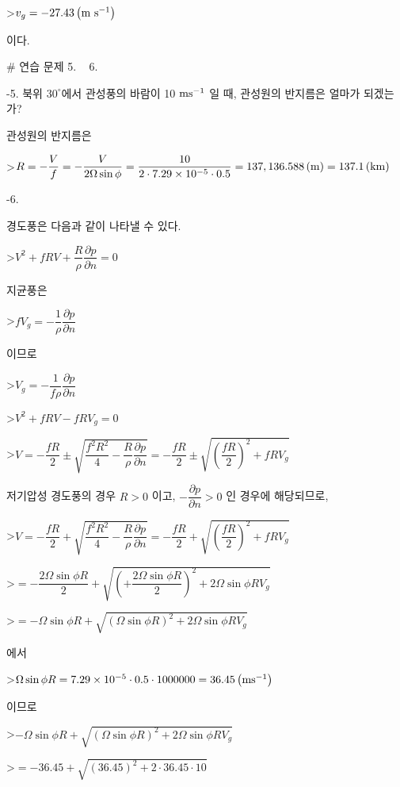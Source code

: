 >$v_{g} = - 27.43 \left( \rm m~ s^{-1} \right) $

이다.



# 연습 문제 5. ~ 6.


-5. 북위  $30^{\circ}$에서 관성풍의 바람이 10 $\rm m s^{-1}$ 일 때, 관성원의 반지름은 얼마가 되겠는가?


관성원의 반지름은 

>$ R = - \dfrac{V}{f} = - \dfrac{V}{2 \Omega \sin \phi} = \dfrac{10}{2 \cdot 7.29 \times 10^{-5} \cdot 0.5} = 137,136.588 \left( \rm m \right) = 137.1 \left( \rm km \right)$

-6. 


경도풍은 다음과 같이 나타낼 수 있다.

>$ V^{2} + fRV + \dfrac{R}{\rho} \dfrac{\partial p}{\partial n} = 0$

지균풍은 

>$f V_{g} = -\dfrac{1}{\rho}\dfrac{\partial p}{\partial n}$ 

이므로 

>$V_{g} = -\dfrac{1}{f \rho}\dfrac{\partial p}{\partial n}$ 

>$ V^{2} + fRV - f R V_{g} = 0$


>$ V = -\dfrac{fR}{2} \pm \sqrt{ \dfrac{f^{2} R^{2}}{4} - \dfrac{R}{\rho}\dfrac{\partial p}{\partial n} } = -\dfrac{fR}{2} \pm \sqrt{ {\left(\dfrac{f R}{2} \right)}^{2} + f R V_{g} }$


저기압성 경도풍의 경우 $ R > 0$ 이고, $- \dfrac{\partial p}{\partial n} > 0$ 인 경우에 해당되므로, 

>$ V = -\dfrac{fR}{2} + \sqrt{ \dfrac{f^{2} R^{2}}{4} - \dfrac{R}{\rho}\dfrac{\partial p}{\partial n} } = -\dfrac{fR}{2} + \sqrt{ {\left(\dfrac{f R}{2} \right)}^{2} + f R V_{g} }$

>$ =  -\dfrac{ 2 \Omega \sin \phi R}{2} + \sqrt{ {\left(+\dfrac{ 2 \Omega \sin \phi R}{2} \right)}^{2} + 2 \Omega \sin \phi R V_{g} } $

>$ =  -\Omega \sin \phi R + \sqrt{ {\left(\Omega \sin \phi R \right)}^{2} + 2 \Omega \sin \phi R V_{g} } $

에서 

>$ \Omega \sin \phi R = 7.29 \times 10^{-5} \cdot 0.5 \cdot 1000000 =  36.45  \left( \rm m s^{-1} \right)$

이므로

>$ -\Omega \sin \phi R + \sqrt{ {\left(\Omega \sin \phi R \right)}^{2} + 2 \Omega \sin \phi R V_{g} }$

>$= -36.45+ \sqrt{ {\left(36.45 \right)}^{2} + 2 \cdot 36.45 \cdot 10 } $

